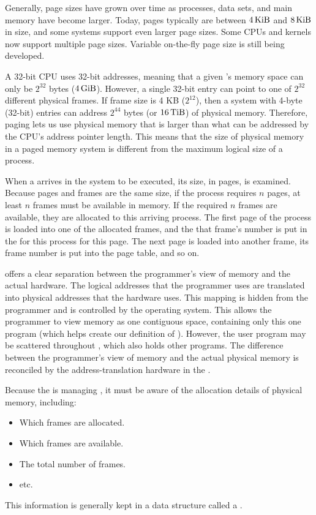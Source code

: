 Generally, page sizes have grown over time as processes, data sets, and main memory have become larger.
Today, pages typically are between $\SI{4}{\kibi{}\byte{}}$ and $\SI{8}{\kibi{}\byte{}}$ in size, and some systems support even larger page sizes.
Some CPUs and kernels now support multiple page sizes.
Variable on-the-fly page size is still being developed.

A 32-bit CPU uses 32-bit addresses, meaning that a given 's memory space can only be $2^{32}$ bytes ($\SI{4}{\gibi{}\byte{}}$).
However, a single 32-bit entry can point to one of $2^{32}$ different physical frames.
If frame size is 4 KB ($2^{12}$), then a system with 4-byte (32-bit) entries can address $2^{44}$ bytes (or $\SI{16}{\tebi{}\byte{}}$) of physical memory.
Therefore, paging lets us use physical memory that is larger than what can be addressed by the CPU’s address pointer length.
This means that the size of physical memory in a paged memory system is different from the maximum logical size of a process.

When a  arrives in the system to be executed, its size, in pages, is examined.
Because pages and frames are the same size, if the process requires $n$ pages, at least $n$ frames must be available in memory.
If the required $n$ frames are available, they are allocated to this arriving process.
The first page of the process is loaded into one of the allocated frames, and the that frame's number is put in the  for this process for this page.
The next page is loaded into another frame, its frame number is put into the page table, and so on.

 offers a clear separation between the programmer’s view of memory and the actual hardware.
The logical addresses that the programmer uses are translated into physical addresses that the hardware uses.
This mapping is hidden from the programmer and is controlled by the operating system.
This allows the programmer to view memory as one contiguous space, containing only this one program (which helps create our definition of ).
However, the user program may be scattered throughout , which also holds other programs.
The difference between the programmer’s view of memory and the actual physical memory is reconciled by the address-translation hardware in the .

Because the  is managing , it must be aware of the allocation details of physical memory, including:
\begin{itemize}[noitemsep]
\item Which frames are allocated.
\item Which frames are available.
\item The total number of frames.
\item etc.
\end{itemize}
This information is generally kept in a data structure called a .

